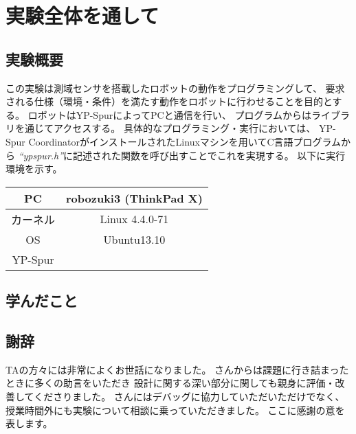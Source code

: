 \documentclass[main]{subfiles}
\begin{document}
\chapter{実験全体を通して}
\section{実験概要}
この実験は測域センサを搭載したロボットの動作をプログラミングして、
要求される仕様（環境・条件）を満たす動作をロボットに行わせることを目的とする。
ロボットはYP-SpurによってPCと通信を行い、
プログラムからはライブラリを通じてアクセスする。
具体的なプログラミング・実行においては、
YP-Spur CoordinatorがインストールされたLinuxマシンを用いてC言語プログラムから
\textit{``ypspur.h''}に記述された関数を呼び出すことでこれを実現する。
以下に実行環境を示す。

\begin{table}[H]
	\centering
	\begin{tabular}{|c|c|}
		\hline
		PC & robozuki3 (ThinkPad X)  \\\hline
		カーネル & Linux 4.4.0-71\\\hline
		OS & Ubuntu13.10\\\hline
		YP-Spur & \\\hline
	\end{tabular}
\end{table}

\section{学んだこと}

\section{謝辞}
TAの方々には非常によくお世話になりました。
\TAa さんからは課題に行き詰まったときに多くの助言をいただき
設計に関する深い部分に関しても親身に評価・改善してくださりました。
\TAb さんにはデバッグに協力していただいただけでなく、
授業時間外にも実験について相談に乗っていただきました。
ここに感謝の意を表します。
\end{document}
